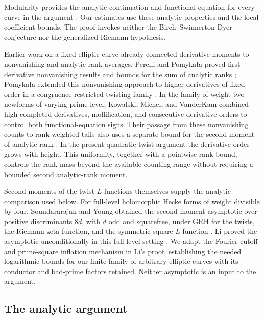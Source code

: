 Modularity provides the analytic continuation and functional equation
for every curve in the argument
\cite[Theorem~A]{BreuilConradDiamondTaylor2001}. Our estimates use these analytic properties
and the local coefficient bounds. The proof invokes neither the
Birch--Swinnerton-Dyer conjecture nor the generalized Riemann hypothesis.

Earlier work on a fixed elliptic curve already connected derivative
moments to nonvanishing and analytic-rank averages. Perelli and
Pomyka\l a proved first-derivative nonvanishing results and bounds for
the sum of analytic ranks \cite{PerelliPomykala1997};
Pomyka\l a extended this nonvanishing approach to higher derivatives of
fixed order in a congruence-restricted twisting family \cite{Pomykala1997}.
In the family of weight-two newforms of varying prime level,
Kowalski, Michel, and VanderKam combined high completed derivatives,
mollification, and consecutive derivative orders to control both
functional-equation signs. Their passage from these nonvanishing counts
to rank-weighted tails also uses a separate bound for the second moment
of analytic rank
\cite[Sections~2, 4, and~8]{KowalskiMichelVanderKam2000}.
In the present quadratic-twist argument the derivative order grows with
height. This uniformity, together with a pointwise rank bound, controls
the rank mass beyond the available counting range without requiring a
bounded second analytic-rank moment.

Second moments of the twist \(L\)-functions themselves supply the
analytic comparison used below. For full-level holomorphic Hecke forms
of weight divisible by four, Soundararajan and Young obtained the
second-moment asymptotic over positive discriminants \(8d\), with \(d\)
odd and squarefree, under GRH for the twists, the Riemann zeta function,
and the symmetric-square \(L\)-function
\cite[Theorem~1.2]{SoundararajanYoung2010}.
Li proved the asymptotic unconditionally in this full-level setting
\cite[Theorem~1.1]{Li2022}. We adapt the Fourier-cutoff and prime-square
inflation mechanism in Li's proof, establishing the needed logarithmic
bounds for our finite family of arbitrary elliptic curves with its
conductor and bad-prime factors retained. Neither asymptotic is an input
to the argument.

\subsection{The analytic argument}

